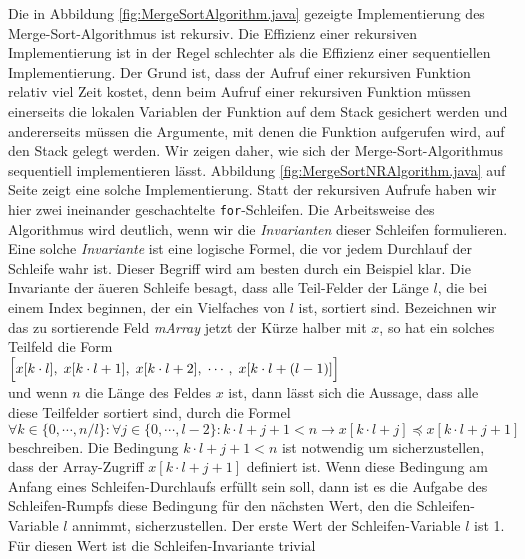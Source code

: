 \noindent
Die in Abbildung \ref{fig:MergeSortAlgorithm.java} gezeigte Implementierung des
Merge-Sort-Algorithmus ist rekursiv.  Die Effizienz einer rekursiven Implementierung ist
in der Regel schlechter als die Effizienz einer sequentiellen Implementierung.
Der Grund ist, dass der Aufruf einer rekursiven Funktion relativ viel Zeit kostet, denn
beim Aufruf einer rekursiven Funktion m\"ussen einerseits die lokalen Variablen der Funktion auf dem
Stack gesichert werden und andererseits m\"ussen die Argumente, mit denen die Funktion
aufgerufen wird, auf den Stack gelegt werden.  Wir zeigen daher, wie sich der
Merge-Sort-Algorithmus sequentiell implementieren l\"asst.  Abbildung
\ref{fig:MergeSortNRAlgorithm.java} auf Seite \pageref{fig:MergeSortNRAlgorithm.java}
zeigt eine solche Implementierung.
Statt der rekursiven Aufrufe haben wir hier zwei ineinander geschachtelte
\texttt{for}-Schleifen.  Die Arbeitsweise des Algorithmus wird deutlich, wenn wir die
\emph{Invarianten} dieser Schleifen formulieren.  Eine solche \emph{Invariante} ist eine
logische Formel, die vor jedem Durchlauf der Schleife wahr ist.  Dieser Begriff
wird am besten durch ein Beispiel klar.  Die Invariante der \"au\3eren Schleife besagt,
dass alle Teil-Felder der L\"ange $l$, die bei einem Index beginnen, der ein Vielfaches von
$l$ ist, sortiert sind.  Bezeichnen wir das zu sortierende Feld \textsl{mArray} jetzt der
K\"urze halber mit $x$, so hat ein solches Teilfeld die Form 
\\[0.1cm]
\hspace*{1.3cm}
$\Bigl[x[k\cdot l],\; x[k\cdot l+1],\; x[k\cdot l+2],\; \cdots,\; x[k\cdot l+(l-1)]\Bigr]$
\\[0.1cm]
und wenn $n$ die L\"ange des Feldes $x$ ist, dann l\"asst sich die Aussage, dass alle
diese Teilfelder sortiert sind, durch die Formel 
\\[0.1cm]
\hspace*{0.8cm}
$\forall k \in \{0, \cdots, n/l\}: \forall j\in\{0,\cdots,l-2\}: k\cdot l+j+1 < n \rightarrow x[k\cdot l+j] \preceq x[k\cdot l+j+1]$
\\[0.1cm]
beschreiben. Die Bedingung $k\cdot l+j+1 < n$  ist notwendig um sicherzustellen, dass der
Array-Zugriff $x[k\cdot l+j+1]$ definiert ist.  Wenn diese Bedingung am Anfang eines Schleifen-Durchlaufs
erf\"ullt sein soll, dann ist es die Aufgabe des Schleifen-Rumpfs diese Bedingung f\"ur den
n\"achsten Wert, den die Schleifen-Variable $l$ annimmt, sicherzustellen.  Der erste Wert
der Schleifen-Variable $l$ ist 1.   F\"ur diesen Wert ist die Schleifen-Invariante trivial
